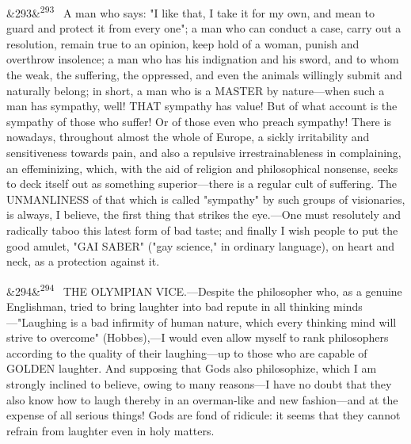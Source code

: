 \documentclass[12pt]{article}
\newcommand{\para}[1][]{\par\noindent\ifx&#1&\else\textsuperscript{\footnotesize #1}~\fi}
\begin{document}
\para[293] A man who says: "I like that, I take it for my own, and mean to guard and protect it from every one"; a man who can conduct a case, carry out a resolution, remain true to an opinion, keep hold of a woman, punish and overthrow insolence; a man who has his indignation and his sword, and to whom the weak, the suffering, the oppressed, and even the animals willingly submit and naturally belong; in short, a man who is a MASTER by nature---when such a man has sympathy, well! THAT sympathy has value! But of what account is the sympathy of those who suffer! Or of those even who preach sympathy! There is nowadays, throughout almost the whole of Europe, a sickly irritability and sensitiveness towards pain, and also a repulsive irrestrainableness in complaining, an effeminizing, which, with the aid of religion and philosophical nonsense, seeks to deck itself out as something superior---there is a regular cult of suffering. The UNMANLINESS of that which is called "sympathy" by such groups of visionaries, is always, I believe, the first thing that strikes the eye.---One must resolutely and radically taboo this latest form of bad taste; and finally I wish people to put the good amulet, "GAI SABER" ("gay science," in ordinary language), on heart and neck, as a protection against it.

\para[294] THE OLYMPIAN VICE.---Despite the philosopher who, as a genuine Englishman, tried to bring laughter into bad repute in all thinking minds---"Laughing is a bad infirmity of human nature, which every thinking mind will strive to overcome" (Hobbes),---I would even allow myself to rank philosophers according to the quality of their laughing---up to those who are capable of GOLDEN laughter. And supposing that Gods also philosophize, which I am strongly inclined to believe, owing to many reasons---I have no doubt that they also know how to laugh thereby in an overman-like and new fashion---and at the expense of all serious things! Gods are fond of ridicule: it seems that they cannot refrain from laughter even in holy matters.
\end{document}
